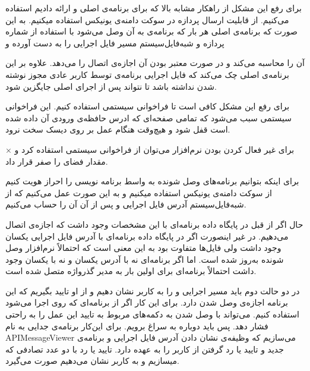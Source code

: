 برای رفع این مشکل از راهکار مشابه بالا که برای برنامه‌ی اصلی و  ارائه دادیم استفاده می‌کنیم. از قابلیت ارسال  پردازه در سوکت دامنه‌ی یونیکس استفاده میکنیم. به این صورت که برنامه‌ی اصلی هر بار که برنامه‌ی  به آن وصل می‌شود با استفاده از شماره پردازه و شبه‌فایل‌سیستم  مسیر فایل اجرایی  را به دست آورده و { آن را محاسبه می‌کند و در صورت معتبر بودن آن اجازه‌ی اتصال را می‌دهد. علاوه بر این برنامه‌ی اصلی چک می‌کند که فایل اجرایی برنامه‌ی  توسط کاربر عادی مجوز نوشته شدن نداشته باشد تا  نتواند پس از اجرای  اصلی جایگزین شود.


برای رفع این مشکل کافی است تا فراخوانی سیستمی  استفاده کنیم. این فراخوانی سیستمی سبب می‌شود که تمامی صفحه‌ای که ادرس حافظه‌ی ورودی آن داده شده است قفل شود و هیچ‌وقت هنگام عمل  بر روی دیسک سخت نرود.

×
برای غیر فعال کردن  بودن نرم‌افزار می‌توان از فراخوانی سیستمی  استفاده کرد و مقدار فضای  را صفر قرار داد.



برای اینکه بتوانیم برنامه‌های وصل شونده به واسط برنامه نویسی را احراز هویت کنیم از سوکت دامنه‌ی یونیکس استفاده میکنیم و به این صورت عمل می‌کنیم که از شبه‌فایل‌سیستم  آدرس فایل اجرایی و پس از آن  آن را حساب می‌کنیم. 

حال اگر از قبل در پایگاه داده برنامه‌ای با این مشخصات وجود داشت که اجازه‌ی اتصال می‌دهیم. در غیر اینصورت اگر در پایگاه داده برنامه‌ای با آدرس فایل اجرایی یکسان وجود داشت ولی  فایل‌ها متفاوت بود به این معنی است که احتمالاً نرم‌افزار وصل شونده به‌روز شده است. اما اگر برنامه‌ای نه با آدرس یکسان و نه با  یکسان وجود داشت احتمالاً برنامه‌ای برای اولین بار به مدیر گذرواژه متصل شده است.

در دو حالت دوم باید مسیر اجرایی و  را به کاربر نشان دهیم و از او تایید بگیریم که این برنامه اجازه‌ی وصل شدن دارد. برای این کار اگر از برنامه‌ای که روی  اجرا می‌شود استفاده کنیم.  می‌تواند با وصل شدن به  دکمه‌های مربوط به تایید این عمل را به راحتی فشار دهد. پس باید دوباره به سراغ  برویم. برای این‌کار برنامه‌ی جدایی به نام APIMessageViewer می‌سازیم که وظیفه‌ی نشان دادن آدرس فایل اجرایی و  برنامه‌ی جدید و تایید یا رد گرفتن از کاربر را به عهده دارد. تایید یا رد با دو عدد تصادفی که میسازیم و به کاربر نشان می‌دهیم صورت می‌گیرد. 

}
